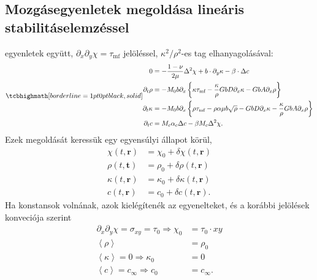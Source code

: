 \documentclass[10pt,a4paper]{scrartcl}
\let\mathbf\bm
\begin{document}
\subsection{Mozgásegyenletek megoldása lineáris stabilitáselemzéssel}
 egyenletek együtt, $\partial_x \partial_y \chi = {\tau _{{\text{mf}}}}$ jelöléssel, $\kappa^2/\rho^2$-es tag elhanyagolásával:
\begin{gather} \label{eq:eom}
\tcbhighmath[borderline={1pt}{0pt}{black,solid}]{
\begin{aligned}
0 & = - \frac{{1 - \nu }}{{2\mu }}{\Delta ^2}\chi  + b\cdot\partial_y\kappa - \beta  \cdot \Delta c \\ 
    {\partial _t}\rho  &  =  - {M_0}b{\partial _x}\left\{ {\kappa {\tau _{{\text{mf}}}} - \frac{\kappa }{\rho }GbD{\partial _x}\kappa  - GbA{\partial _x}\rho } \right\} \\ 
  {\partial _t}\kappa  &  =  - {M_0}b{\partial _x}\left\{ {\rho {\tau _{{\text{mf}}}} - \rho \alpha \mu b\sqrt \rho - GbD{\partial _x}\kappa  - \frac{\kappa }{\rho } GbA{\partial _x}\rho } \right\} \\
  \partial_t c & =  {M_c}{\alpha _c}\Delta c - \beta {M_c}\Delta^2 \chi.
\end{aligned}  }
\end{gather}
Ezek megoldását keressük egy egyensúlyi állapot körül,
\[\begin{aligned}
  \chi \left( {t,{\mathbf{r}}} \right) &  = {\chi _0} + \delta \chi \left( {t,{\mathbf{r}}} \right) \\ 
  \rho \left( {t,{\mathbf{t}}} \right) &  = {\rho _0} + \delta \rho \left( {t,{\mathbf{r}}} \right) \\ 
  \kappa \left( {t,{\mathbf{r}}} \right) &  = {\kappa _0} + \delta \kappa \left( {t,{\mathbf{r}}} \right) \\ 
  c\left( {t,{\mathbf{r}}} \right) &  = {c_0} + \delta c\left( {t,{\mathbf{r}}} \right).
\end{aligned} \]
Ha konstansok volnának, azok kielégítenék az egyenelteket, és a korábbi jelölések konveciója szerint 
\[\begin{aligned}
  {\partial _x}{\partial _y}\chi  = {\sigma _{xy}} = {\tau _0} \Rightarrow {\chi _0} &  = {\tau _0} \cdot xy \\ 
  \left\langle \rho  \right\rangle  &  = {\rho _0} \\ 
  \left\langle \kappa  \right\rangle  = 0 \Rightarrow {\kappa _0} &  = 0 \\ 
  \left\langle c \right\rangle  = {c_\infty } \Rightarrow {c_0} &  = {c_\infty }. \\ 
\end{aligned} \]
\end{document}
